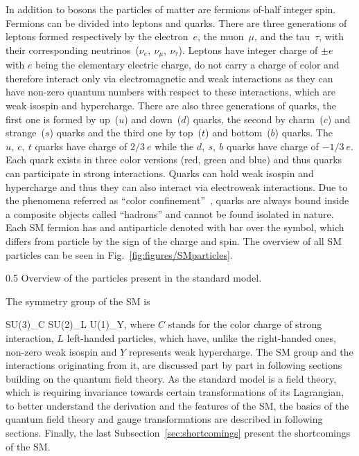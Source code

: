 In addition  to bosons the particles of matter are fermions of-half integer spin. Fermions can be divided into leptons and quarks. There are three generations of leptons formed respectively by the electron~$e$, the muon~$\mu$, and the tau~$\tau$, with their corresponding neutrinos~($\nu_{e},~\nu_{\mu},~\nu_{\tau}$). Leptons have integer charge of $\pm e$ with $e$ being the elementary electric charge, do not carry a charge of color and therefore interact only via electromagnetic and weak interactions as they can have non-zero quantum numbers with respect to these interactions, which are weak isospin and hypercharge. There are also three generations of quarks, the first one is formed by up~($u$) and down~($d$) quarks, the second by charm~($c$) and strange~($s$) quarks and the third one by top~($t$) and bottom~($b$) quarks. The $u,~c,~t$ quarks have charge of $2/3~e$ while the $d,~s,~b$ quarks have charge of $-1/3~e$. Each quark exists in three color versions (red, green and blue) and thus quarks can participate in strong interactions. Quarks can hold weak isospin and hypercharge and thus they can also interact via electroweak interactions. Due to the phenomena referred as ``color confinement''~\cite{Alkofer:2006fu}, quarks are always bound inside a composite objects called ``hadrons'' and cannot be found isolated in nature. Each SM fermion has and antiparticle denoted with bar over the symbol, which differs from particle by the sign of the charge and spin. The overview of all SM particles can be seen in Fig.~\ref{fig:figures/SMparticles}.



                 {0.5}       %
                 { Overview of the particles present in the standard model.}

The symmetry group of the SM is

{
SU(3)_{C} \otimes SU(2)_{L} \otimes U(1)_{Y},
}
where $C$ stands for the color charge of strong interaction, $L$ left-handed particles, which have, unlike the right-handed ones, non-zero weak isospin and $Y$ represents weak hypercharge. The SM group and the interactions originating from it, are discussed part by part in following sections building on the quantum field theory. As the standard model is a field theory, which is requiring invariance towards certain transformations of its Lagrangian, to better understand the derivation and the features of the SM, the basics of the quantum field theory and gauge transformations are described in following sections. Finally, the last Subsection~\ref{sec:shortcomings} present the shortcomings of the SM.





